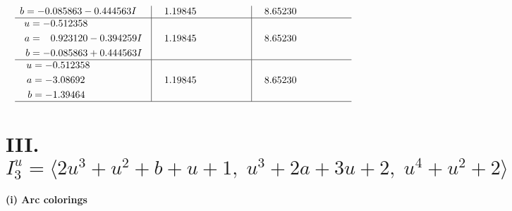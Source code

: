 \documentclass[1p]{elsarticle_modified}
\theoremstyle{definition}
\begin{document}
$$\begin{array}{c|c|c}
\begin{aligned}
b &= -0.085863 - 0.444563 I\end{aligned}
 & \phantom{-}1.19845\phantom{ +0.000000I} & \phantom{-}8.65230\phantom{ +0.000000I} \\ \hline\begin{aligned}
u &= -0.512358\phantom{ +0.000000I} \\
a &= \phantom{-}0.923120 - 0.394259 I \\
b &= -0.085863 + 0.444563 I\end{aligned}
 & \phantom{-}1.19845\phantom{ +0.000000I} & \phantom{-}8.65230\phantom{ +0.000000I} \\ \hline\begin{aligned}
u &= -0.512358\phantom{ +0.000000I} \\
a &= -3.08692\phantom{ +0.000000I} \\
b &= -1.39464\phantom{ +0.000000I}\end{aligned}
 & \phantom{-}1.19845\phantom{ +0.000000I} & \phantom{-}8.65230\phantom{ +0.000000I}\\
 \hline 
 \end{array}$$\newpage\newpage\renewcommand{\arraystretch}{1}
\centering \section*{III. $I^u_{3}= \langle 2 u^3+u^2+b+u+1,\;u^3+2 a+3 u+2,\;u^4+u^2+2 \rangle$}
\flushleft \textbf{(i) Arc colorings}\\
\end{document}
